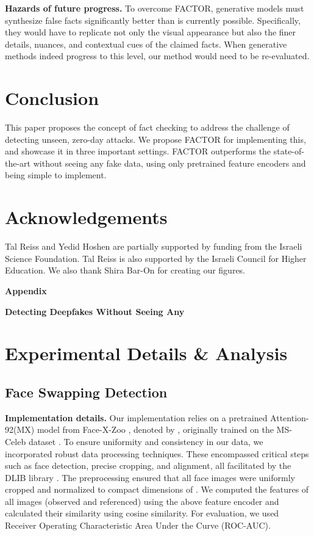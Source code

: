 \documentclass{article} \usepackage{iclr2024_conference,times}
\begin{document}
\textbf{Hazards of future progress.} To overcome FACTOR, generative models must synthesize false facts significantly better than is currently possible. Specifically, they would have to replicate not only the visual appearance but also the finer details, nuances, and contextual cues of the claimed facts. When generative methods indeed progress to this level, our method would need to be re-evaluated.

\section{Conclusion}
This paper proposes the concept of fact checking to address the challenge of detecting unseen, zero-day attacks. We propose FACTOR for implementing this, and showcase it in three important settings. FACTOR outperforms the state-of-the-art without seeing any fake data, using only pretrained feature encoders and being simple to implement.

\section*{Acknowledgements}
Tal Reiss and Yedid Hoshen are partially supported by funding from the Israeli Science Foundation. Tal Reiss is also supported by the Israeli Council for Higher Education. We also thank Shira Bar-On for creating our figures.





\newpage
\clearpage
\appendix

\centerline{\textbf{\LARGE Appendix}}
\vspace{1.5em}
\centerline{\textbf{\Large Detecting Deepfakes Without Seeing Any}}
\vspace{1em}


\section{Experimental Details \& Analysis}

\subsection{Face Swapping Detection}
\label{app:face_forgery}

\textbf{Implementation details.} Our implementation relies on a pretrained Attention-92(MX) model from Face-X-Zoo \citep{facex}, denoted by , originally trained on the MS-Celeb dataset \citep{ms_celeb}. To ensure uniformity and consistency in our data, we incorporated robust data processing techniques. These encompassed critical steps such as face detection, precise cropping, and alignment, all facilitated by the DLIB library \citep{dlib}. The preprocessing ensured that all face images were uniformly cropped and normalized to compact dimensions of . We computed the features of all images (observed and referenced) using the above feature encoder and calculated their similarity using cosine similarity. For evaluation, we used Receiver Operating Characteristic Area Under the Curve (ROC-AUC).
\end{document}
